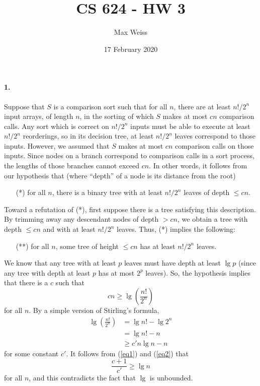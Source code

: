 \documentclass[
]{article}
\date{17 February 2020}
\title{CS 624 - HW 3}
\author{Max Weiss}
\begin{document}
\maketitle

\paragraph{1.} %
Suppose that $S$ is a comparison sort such that for all $n$, there are at least  $n!/2^n$ input arrays, of length $n$, in the sorting of which $S$ makes at most $cn$ comparison calls.  
Any sort which is correct on $n!/2^n$ inputs must be able to execute at least $n!/2^n$ reorderings, so in its decision tree, at least $n!/2^n$ leaves correspond to those inputs.  However, we assumed that $S$ makes at most $cn$ comparison calls on those inputs.  Since nodes on a branch correspond to comparison calls in a sort process, the lengths of those branches cannot exceed $cn$.  In other words, it follows from our hypothesis that (where ``depth'' of a node is its distance from the root)
\begin{itemize}
\item[(*)] for all $n$, there is a binary tree with at least $n!/2^n$ leaves of depth  $\leq cn$.
\end{itemize}
Toward a refutation of (*), first suppose there is a tree satisfying this description.  By trimming away any descendant nodes of depth $> cn$, we obtain a tree with depth $\leq cn$ and with at least $n!/2^n$ leaves.  Thus, (*) implies the following:
\begin{itemize}
\item[(**)] for all $n$, some tree of height $\leq cn$ has at least $n!/2^n$ leaves.
\end{itemize}

We know that any tree with at least $p$ leaves must have depth at least $\lg p$ (since any tree with depth at least $p$ has at most $2^p$ leaves).  So, the hypothesis implies that there is a $c$ such that 
\begin{equation}
  \label{eq1}
 cn \geq \lg \left(\frac{n!}{2^n}\right)
\end{equation}
for all $n$.
By a simple version of Stirling's formula,
\begin{align}
  \nonumber
  \lg \left(\frac{n!}{2^n}\right)
  &= \lg n! - \lg 2^n
  \\
  \nonumber
  &= \lg n! - n
  \\ 
  \label{eq2}
  &\geq 
c'n \lg n - n
\end{align} for some constant $c'$.  It follows from (\ref{eq1}) and (\ref{eq2}) that 
\begin{equation}
  \frac{c+1}{c'} \geq \lg n
\end{equation}
for all $n$, and this contradicts the fact that $\lg$ is unbounded.
\end{document}

